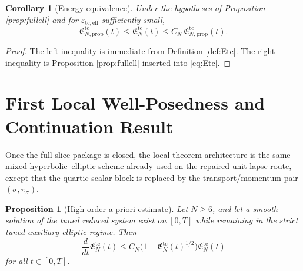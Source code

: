 \documentclass[11pt]{article}
\newtheorem{proposition}{Proposition}
\newtheorem{corollary}{Corollary}
\begin{document}
\begin{corollary}[Energy equivalence]
\label{cor:equiv}
Under the hypotheses of Proposition \ref{prop:fullell} and for \(\varepsilon_{\mathrm{tc,ell}}\) sufficiently small,
\begin{equation}
\mathfrak E_{N,\mathrm{prop}}^{\mathrm{tc}}(t)
\le
\mathfrak E_N^{\mathrm{tc}}(t)
\le
C_N\,\mathfrak E_{N,\mathrm{prop}}^{\mathrm{tc}}(t).
\label{eq:energyequiv}
\end{equation}
\end{corollary}

\begin{proof}
The left inequality is immediate from Definition \ref{def:Etc}. The right inequality is Proposition \ref{prop:fullell} inserted into \eqref{eq:Etc}.
\end{proof}

\section{First Local Well-Posedness and Continuation Result}

Once the full slice package is closed, the local theorem architecture is the same mixed hyperbolic--elliptic scheme already used on the repaired unit-lapse route, except that the quartic scalar block is replaced by the transport/momentum pair \((\sigma,\pi_\sigma)\).

\begin{proposition}[High-order a priori estimate]
\label{prop:apriori}
Let \(N\ge 6\), and let a smooth solution of the tuned reduced system exist on \([0,T]\) while remaining in the strict tuned auxiliary-elliptic regime. Then
\begin{equation}
\frac{d}{dt}\mathfrak E_N^{\mathrm{tc}}(t)
\le
C_N\bigl(1+\mathfrak E_N^{\mathrm{tc}}(t)^{1/2}\bigr)\mathfrak E_N^{\mathrm{tc}}(t)
\label{eq:apriori}
\end{equation}
for all \(t\in[0,T]\).
\end{proposition}
\end{document}
